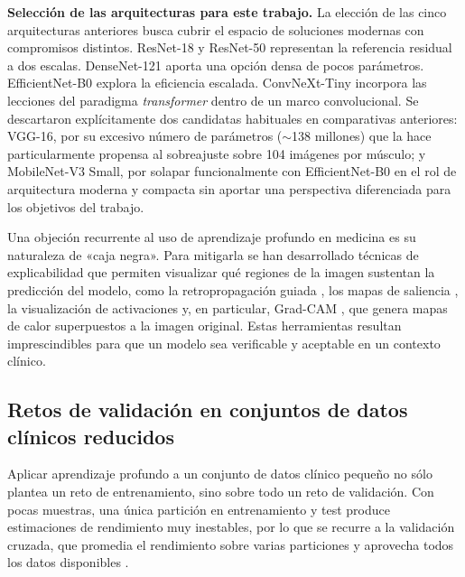 \documentclass[12pt]{extarticle}
\numberwithin{equation}{section}
\begin{document}
\begin{refsection}
\textbf{Selección de las arquitecturas para este trabajo.} La elección de las cinco arquitecturas anteriores busca cubrir el espacio de soluciones modernas con compromisos distintos. ResNet-18 y ResNet-50 representan la referencia residual a dos escalas. DenseNet-121 aporta una opción densa de pocos parámetros. EfficientNet-B0 explora la eficiencia escalada. ConvNeXt-Tiny incorpora las lecciones del paradigma \textit{transformer} dentro de un marco convolucional. Se descartaron explícitamente dos candidatas habituales en comparativas anteriores: VGG-16, por su excesivo número de parámetros ($\sim$138 millones) que la hace particularmente propensa al sobreajuste sobre 104 imágenes por músculo; y MobileNet-V3 Small, por solapar funcionalmente con EfficientNet-B0 en el rol de arquitectura moderna y compacta sin aportar una perspectiva diferenciada para los objetivos del trabajo.

Una objeción recurrente al uso de aprendizaje profundo en medicina es su naturaleza de «caja negra». Para mitigarla se han desarrollado técnicas de explicabilidad que permiten visualizar qué regiones de la imagen sustentan la predicción del modelo, como la retropropagación guiada \cite{springenberg2015striving}, los mapas de saliencia \cite{simonyan2014deep}, la visualización de activaciones \cite{zeiler2014visualizing} y, en particular, Grad-CAM \cite{selvaraju2017gradcam}, que genera mapas de calor superpuestos a la imagen original. Estas herramientas resultan imprescindibles para que un modelo sea verificable y aceptable en un contexto clínico.

\subsection{Retos de validación en conjuntos de datos clínicos reducidos}\label{subsec:validacion}

Aplicar aprendizaje profundo a un conjunto de datos clínico pequeño no sólo plantea un reto de entrenamiento, sino sobre todo un reto de validación. Con pocas muestras, una única partición en entrenamiento y test produce estimaciones de rendimiento muy inestables, por lo que se recurre a la validación cruzada, que promedia el rendimiento sobre varias particiones y aprovecha todos los datos disponibles \cite{kohavi1995study}.


\end{refsection}
\end{document}
